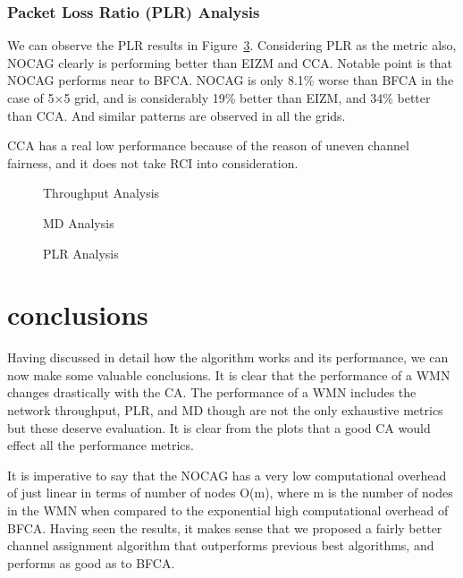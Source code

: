 \documentclass[conference]{IEEEtran}
\begin{document}
\subsubsection{Packet Loss Ratio (PLR) Analysis}

We can observe the PLR  results in Figure~\ref{plr}. 
Considering PLR as the metric also, NOCAG clearly is performing better than EIZM and CCA. 
Notable point is that NOCAG performs near to  BFCA. 
NOCAG is only 8.1\% worse than BFCA in the case of 5$\times$5 grid, and  is considerably 19\% better than EIZM, and  34\% better than CCA. 
And similar patterns are observed in all the grids.

CCA has a real low performance because of the reason of uneven channel fairness, and it does not take RCI into consideration. 

\begin{figure}
    \caption{Throughput Analysis }
     \label{tput}
\end{figure} 

\begin{figure}
  \centering {\texttt{[image: md]}}
    \caption{MD Analysis }
     \label{md}
\end{figure} 

\begin{figure}
    \caption{PLR Analysis}
     \label{plr}
\end{figure} 



\section{conclusions}
Having discussed in detail how the algorithm works and its performance, we can now make some valuable conclusions. 
It is clear that the performance of a WMN changes drastically with the CA. The performance of a WMN includes the network throughput, PLR, and MD though are not the only exhaustive metrics but these deserve evaluation.
It is clear from the plots that a good CA would effect all the performance metrics.

It is imperative to say that the NOCAG has a very low computational overhead of just linear in terms of  number of nodes O(m), where m is the number of nodes in the WMN when compared to 
the exponential high computational overhead of BFCA.
Having seen the results, it makes sense that we proposed a fairly better channel assignment algorithm that
outperforms previous best algorithms, and performs as good as to BFCA.


\end{document}
